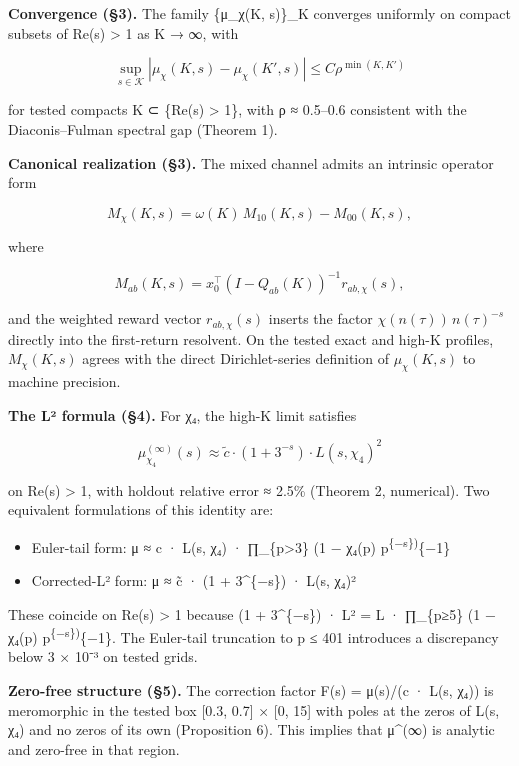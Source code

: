 \documentclass[
  11pt,
]{article}
\providecommand{\tightlist}{%
  \setlength{\itemsep}{0pt}\setlength{\parskip}{0pt}}
\begin{document}
\textbf{Convergence (§3).} The family \{μ\_χ(K, s)\}\_K converges uniformly on
compact subsets of Re(s) \textgreater{} 1 as K → ∞, with

\[\sup_{s \in \mathcal{K}} |\mu_\chi(K, s) - \mu_\chi(K', s)| \leq C \rho^{\min(K,K')}\]

for tested compacts K ⊂ \{Re(s) \textgreater{} 1\}, with ρ ≈ 0.5--0.6 consistent
with the Diaconis--Fulman spectral gap (Theorem 1).

\textbf{Canonical realization (§3).} The mixed channel admits an intrinsic
operator form

\[M_\chi(K,s)=\omega(K)\,M_{10}(K,s)-M_{00}(K,s),\]

where

\[M_{ab}(K,s)=x_0^\top(I-Q_{ab}(K))^{-1}r_{ab,\chi}(s),\]

and the weighted reward vector \(r_{ab,\chi}(s)\) inserts the factor
\(\chi(n(\tau))\,n(\tau)^{-s}\) directly into the first-return resolvent. On the
tested exact and high-K profiles, \(M_\chi(K,s)\) agrees with the direct
Dirichlet-series definition of \(\mu_\chi(K,s)\) to machine precision.

\textbf{The L² formula (§4).} For χ₄, the high-K limit satisfies

\[\mu_{\chi_4}^{(\infty)}(s) \approx \tilde{c} \cdot (1 + 3^{-s}) \cdot L(s, \chi_4)^2\]

on Re(s) \textgreater{} 1, with holdout relative error ≈ 2.5\% (Theorem 2,
numerical). Two equivalent formulations of this identity are:

\begin{itemize}
\tightlist
\item
  Euler-tail form: μ ≈ c · L(s, χ₄) · ∏\_\{p\textgreater3\} (1 − χ₄(p)
  p\textsuperscript{\{−s\})}\{−1\}
\item
  Corrected-L² form: μ ≈ c̃ · (1 + 3\^{}\{−s\}) · L(s, χ₄)²
\end{itemize}

These coincide on Re(s) \textgreater{} 1 because (1 + 3\^{}\{−s\}) · L² = L ·
∏\_\{p≥5\} (1 − χ₄(p) p\textsuperscript{\{−s\})}\{−1\}. The Euler-tail
truncation to p ≤ 401 introduces a discrepancy below 3 × 10⁻³ on tested grids.

\textbf{Zero-free structure (§5).} The correction factor F(s) = μ(s)/(c · L(s,
χ₄)) is meromorphic in the tested box {[}0.3, 0.7{]} × {[}0, 15{]} with poles at
the zeros of L(s, χ₄) and no zeros of its own (Proposition 6). This implies that
μ\^{}(∞) is analytic and zero-free in that region.
\end{document}
